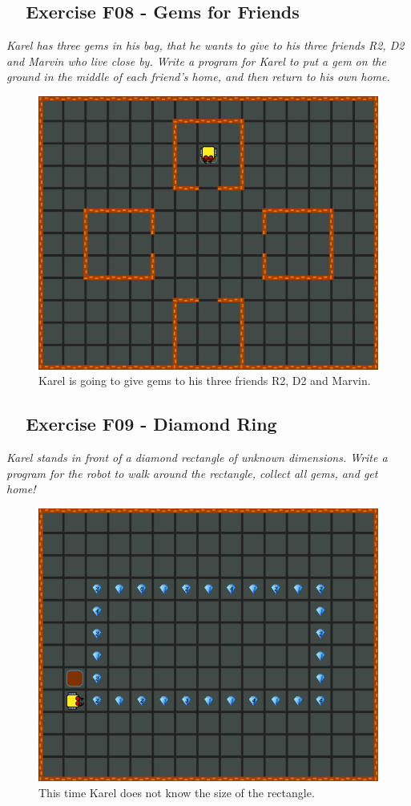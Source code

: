 {{{{\subsection{\ \ Exercise F08 - Gems for Friends}

{\em Karel has three gems in his bag, that he wants to give to his three friends R2, D2 and Marvin who live close by. Write a program for Karel to put a gem on the ground in the middle of each friend's home, and then return to his own home.}\\[-7mm]


\begin{figure}[!ht]
\begin{center}
\includegraphics[height=0.4\textwidth]{imgk/f08.png}
\end{center}
\vspace{-4mm}
\caption{Karel is going to give gems to his three friends R2, D2 and Marvin.}
\label{fig:f08}
\vspace{-10mm}
\end{figure}
\noindent
\newpage

\subsection{\ \ Exercise F09 - Diamond Ring}

{\em Karel stands in front of a diamond rectangle of unknown dimensions. Write a program for the robot to walk around the rectangle, collect all gems, and get home!}\\[-7mm]


\begin{figure}[!ht]
\begin{center}
\includegraphics[height=0.4\textwidth]{imgk/f09.png}
\end{center}
\vspace{-4mm}
\caption{This time Karel does not know the size of the rectangle.}
\label{fig:f09}
\vspace{-10mm}
\end{figure}
\noindent

}}}}
